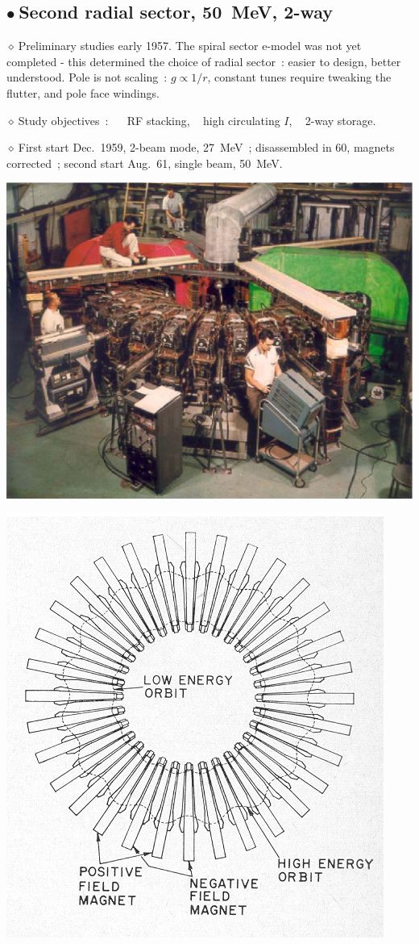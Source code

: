 \documentclass[12pt]{article}
\newcommand{\nib}{\noindent \ensuremath{\bullet~}}
\newcommand{\nid}{\noindent \ensuremath{\diamond~}}
\begin{document}
{\fontsize{17}{20} \selectfont

\subsection*{\LARGE  \nib Second radial sector, 50~MeV,  2-way}


\nid Preliminary studies early 1957. The spiral sector e-model was not yet completed - this determined the choice of radial sector~:  
easier to design, better understood.  Pole is not scaling~: $g\propto 1/r$, constant tunes require tweaking the flutter, and pole face windings.

\nid Study objectives~: ~~ RF stacking, ~ high circulating $I$, ~ 2-way storage. 

\nid First start Dec.~1959, 2-beam mode, 27~MeV~; disassembled in 60, magnets corrected~;  second start Aug.~61, single beam, 50~MeV. \\[-2ex]
\begin{minipage}[b]{.38\linewidth}
\centering

\includegraphics*[width=.95\linewidth]{./figs_FFAG_introSlides/2wayFFAG.eps} 

\includegraphics*[width=.6\linewidth]{./figs_FFAG_introSlides/ring3Draw.eps} 


\end{minipage}}
\end{document}
